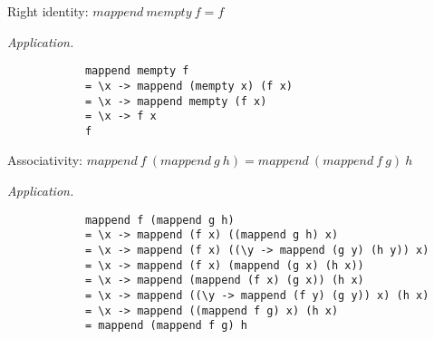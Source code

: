 \begin{parts}
\begin{subparts}
		\subpart[3] Right identity: $\mathit{mappend}~\mathit{mempty}~f = f$ \droppoints
		
		\begin{solution}
			\emph{Application.}
			\begin{verbatim}
			mappend mempty f
			= \x -> mappend (mempty x) (f x)
			= \x -> mappend mempty (f x)
			= \x -> f x
			f
			\end{verbatim}
		\end{solution}
		
		\subpart[5] Associativity: $\mathit{mappend}~f~(\mathit{mappend}~g~h) = \mathit{mappend}~(\mathit{mappend}~f~g)~h$ \droppoints
		
		\begin{solution}
			\emph{Application.}
			\begin{verbatim}
			mappend f (mappend g h)
			= \x -> mappend (f x) ((mappend g h) x)
			= \x -> mappend (f x) ((\y -> mappend (g y) (h y)) x)
			= \x -> mappend (f x) (mappend (g x) (h x))
			= \x -> mappend (mappend (f x) (g x)) (h x)
			= \x -> mappend ((\y -> mappend (f y) (g y)) x) (h x)
			= \x -> mappend ((mappend f g) x) (h x)
			= mappend (mappend f g) h
			\end{verbatim}
		\end{solution}
	\end{subparts}
\end{parts}
